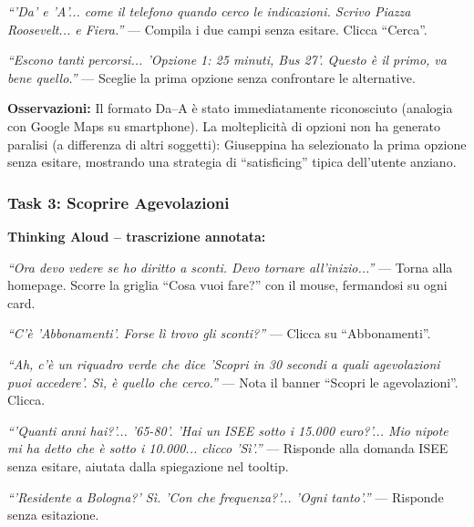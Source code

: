 \documentclass[11pt,a4paper]{article}
\begin{document}
\begin{tcolorbox}[colback=backgroundColor,colframe=borderColor,arc=2mm]
\vspace{0.1cm}
\noindent\textit{``'Da' e 'A'... come il telefono quando cerco le indicazioni. Scrivo Piazza Roosevelt... e Fiera.''} --- Compila i due campi senza esitare. Clicca ``Cerca''.

\vspace{0.1cm}
\noindent\textit{``Escono tanti percorsi... 'Opzione 1: 25 minuti, Bus 27'. Questo \`e il primo, va bene quello.''} --- Sceglie la prima opzione senza confrontare le alternative.

\vspace{0.1cm}
\noindent\textbf{Osservazioni:} Il formato Da--A \`e stato immediatamente riconosciuto (analogia con Google Maps su smartphone). La molteplicit\`a di opzioni non ha generato paralisi (a differenza di altri soggetti): Giuseppina ha selezionato la prima opzione senza esitare, mostrando una strategia di ``satisficing'' tipica dell'utente anziano.

\vspace{0.3cm}
\subsubsection*{Task 3: Scoprire Agevolazioni}
\textbf{Thinking Aloud -- trascrizione annotata:}

\vspace{0.2cm}
\noindent\textit{``Ora devo vedere se ho diritto a sconti. Devo tornare all'inizio...''} --- Torna alla homepage. Scorre la griglia ``Cosa vuoi fare?'' con il mouse, fermandosi su ogni card.

\vspace{0.1cm}
\noindent\textit{``C'\`e 'Abbonamenti'. Forse l\`i trovo gli sconti?''} --- Clicca su ``Abbonamenti''.

\vspace{0.1cm}
\noindent\textit{``Ah, c'\`e un riquadro verde che dice 'Scopri in 30 secondi a quali agevolazioni puoi accedere'. S\`i, \`e quello che cerco.''} --- Nota il banner ``Scopri le agevolazioni''. Clicca.

\vspace{0.1cm}
\noindent\textit{``'Quanti anni hai?'... '65-80'. 'Hai un ISEE sotto i 15.000 euro?'... Mio nipote mi ha detto che \`e sotto i 10.000... clicco 'S\`i'.''} --- Risponde alla domanda ISEE senza esitare, aiutata dalla spiegazione nel tooltip.

\vspace{0.1cm}
\noindent\textit{``'Residente a Bologna?' S\`i. 'Con che frequenza?'... 'Ogni tanto'.''} --- Risponde senza esitazione.


\end{tcolorbox}
\end{document}
